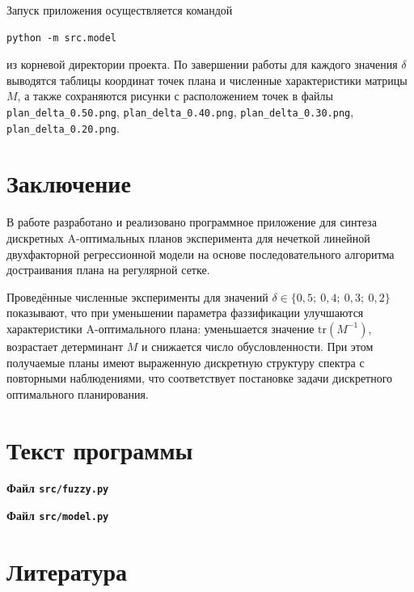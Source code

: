 \documentclass[a4paper,12pt]{article}
\begin{document}
Запуск приложения осуществляется командой
\begin{verbatim}
python -m src.model
\end{verbatim}
из корневой директории проекта. По завершении работы для каждого
значения $\delta$ выводятся таблицы координат точек плана
и численные характеристики матрицы $M$, а также сохраняются
рисунки с расположением точек в файлы
\texttt{plan\_delta\_0.50.png},
\texttt{plan\_delta\_0.40.png},
\texttt{plan\_delta\_0.30.png},
\texttt{plan\_delta\_0.20.png}.

\section*{Заключение}

В работе разработано и реализовано программное приложение
для синтеза дискретных A-оптимальных планов эксперимента
для нечеткой линейной двухфакторной регрессионной модели
на основе последовательного алгоритма достраивания плана
на регулярной сетке.

Проведённые численные эксперименты для значений
$\delta \in \{0{,}5;\ 0{,}4;\ 0{,}3;\ 0{,}2\}$
показывают, что при уменьшении параметра фаззификации
улучшаются характеристики A-оптимального плана:
уменьшается значение $\mathrm{tr}(M^{-1})$,
возрастает детерминант $M$ и снижается число обусловленности.
При этом получаемые планы имеют выраженную дискретную структуру спектра
с повторными наблюдениями, что соответствует постановке задачи
дискретного оптимального планирования.

\section*{Текст программы}

\textbf{Файл \texttt{src/fuzzy.py}}


\textbf{Файл \texttt{src/model.py}}


\section*{Литература}
\end{document}
